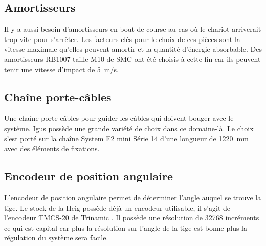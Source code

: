 \subsection{Amortisseurs}
Il y a aussi besoin d'amortisseurs en bout de course au cas où le chariot arriverait trop vite pour s'arrêter. Les facteurs clés pour le choix
de ces pièces sont la vitesse maximale qu'elles peuvent amortir et la quantité d'énergie absorbable. Des amortisseurs RB1007 taille M10
de SMC \cite{SMC} ont été choisis à cette fin car ils peuvent tenir une vitesse d'impact de 5~m/s.

\subsection{Chaîne porte-câbles}
Une chaîne porte-câbles pour guider les câbles qui doivent bouger avec le système. Igus \cite{Igus} possède une grande variété de choix dans
ce domaine-là. Le choix s'est porté sur la chaîne System E2 mini Série 14 d'une longueur de 1220~mm avec des éléments de fixations.

\subsection{Encodeur de position angulaire}
L'encodeur de position angulaire permet de déterminer l'angle auquel se trouve la tige. Le stock de la \acrshort{Heig} possède déjà un encodeur
utilisable, il s'agit de l'encodeur TMCS-20 de Trinamic \cite{Trinamic}. Il possède une résolution de 32768 incréments ce qui est capital car
plus la résolution sur l'angle de la tige est bonne plus la régulation du système sera facile.